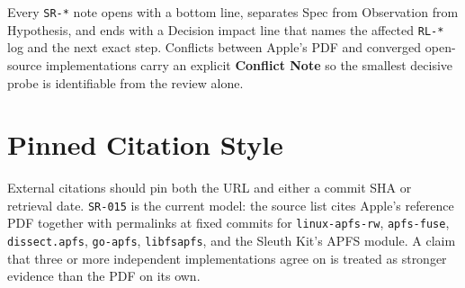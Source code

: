 Every \texttt{SR-*} note opens with a bottom line, separates Spec from
Observation from Hypothesis, and ends with a Decision impact line that names
the affected \texttt{RL-*} log and the next exact step. Conflicts between
Apple's PDF and converged open-source implementations carry an explicit
\textbf{Conflict Note} so the smallest decisive probe is identifiable from the
review alone.

\section{Pinned Citation Style}

External citations should pin both the URL and either a commit SHA or
retrieval date. \texttt{SR-015} is the current model: the source list cites
Apple's reference PDF together with permalinks at fixed commits for
\texttt{linux-apfs-rw}, \texttt{apfs-fuse}, \texttt{dissect.apfs},
\texttt{go-apfs}, \texttt{libfsapfs}, and the Sleuth Kit's APFS module. A
claim that three or more independent implementations agree on is treated as
stronger evidence than the PDF on its own.
